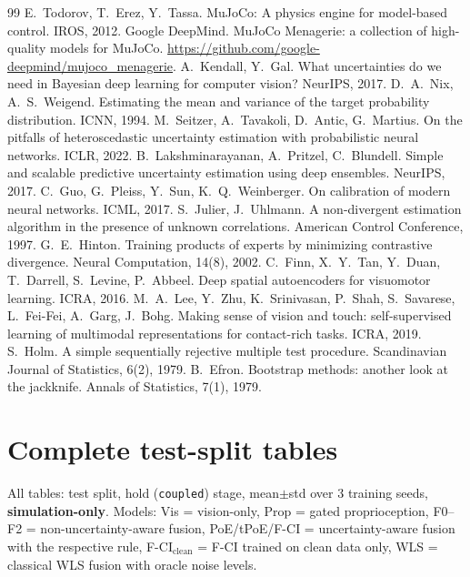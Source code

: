\documentclass[11pt,a4paper]{article}
\newcommand{\simonly}{\textbf{simulation-only}}
\begin{document}
\begin{thebibliography}{99}\small
{} E.~Todorov, T.~Erez, Y.~Tassa. MuJoCo: A physics engine for model-based control. IROS, 2012.
 Google DeepMind. MuJoCo Menagerie: a collection of high-quality models for MuJoCo. \url{https://github.com/google-deepmind/mujoco_menagerie}.
 A.~Kendall, Y.~Gal. What uncertainties do we need in Bayesian deep learning for computer vision? NeurIPS, 2017.
 D.~A.~Nix, A.~S.~Weigend. Estimating the mean and variance of the target probability distribution. ICNN, 1994.
 M.~Seitzer, A.~Tavakoli, D.~Antic, G.~Martius. On the pitfalls of heteroscedastic uncertainty estimation with probabilistic neural networks. ICLR, 2022.
 B.~Lakshminarayanan, A.~Pritzel, C.~Blundell. Simple and scalable predictive uncertainty estimation using deep ensembles. NeurIPS, 2017.
 C.~Guo, G.~Pleiss, Y.~Sun, K.~Q.~Weinberger. On calibration of modern neural networks. ICML, 2017.
 S.~Julier, J.~Uhlmann. A non-divergent estimation algorithm in the presence of unknown correlations. American Control Conference, 1997.
 G.~E.~Hinton. Training products of experts by minimizing contrastive divergence. Neural Computation, 14(8), 2002.
 C.~Finn, X.~Y.~Tan, Y.~Duan, T.~Darrell, S.~Levine, P.~Abbeel. Deep spatial autoencoders for visuomotor learning. ICRA, 2016.
 M.~A.~Lee, Y.~Zhu, K.~Srinivasan, P.~Shah, S.~Savarese, L.~Fei-Fei, A.~Garg, J.~Bohg. Making sense of vision and touch: self-supervised learning of multimodal representations for contact-rich tasks. ICRA, 2019.
 S.~Holm. A simple sequentially rejective multiple test procedure. Scandinavian Journal of Statistics, 6(2), 1979.
 B.~Efron. Bootstrap methods: another look at the jackknife. Annals of Statistics, 7(1), 1979.
\end{thebibliography}

\clearpage
\appendix
\section{Complete test-split tables}
\label{app:tables}
All tables: test split, hold (\texttt{coupled}) stage, mean$\pm$std over 3 training seeds, \simonly{}. Models: Vis = vision-only, Prop = gated proprioception, F0--F2 = non-uncertainty-aware fusion, PoE/tPoE/F-CI = uncertainty-aware fusion with the respective rule, F-CI$_{\mathrm{clean}}$ = F-CI trained on clean data only, WLS = classical WLS fusion with oracle noise levels.

\end{document}
